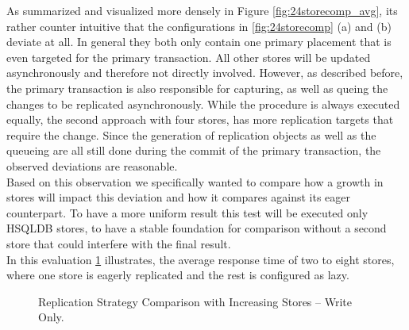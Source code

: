 As summarized and visualized more densely in Figure \ref{fig:24storecomp_avg},
its rather counter intuitive that the configurations in \ref{fig:24storecomp} (a) and (b) deviate at all. 
In general they both only contain one primary placement that is even targeted for the primary transaction.
All other stores will be updated asynchronously and therefore not directly involved.
However, as described before, the primary transaction is also responsible for capturing, as well as queing the changes to be replicated asynchronously.
While the procedure is always executed equally, the second approach with four stores, has more replication targets that require the change. 
Since the generation of replication objects as well as the queueing are all still done during the commit of the primary transaction, the observed
deviations are reasonable.\\


Based on this observation we specifically wanted to compare how a growth in stores will impact this deviation and how it compares against its eager counterpart. 
To have a more uniform result this test will be executed only HSQLDB stores, to have a stable foundation for comparison
without a second store that could interfere with the final result.\\
In this evaluation \ref{fig:stores_comp} illustrates, the average response time of two to eight stores, where one store is eagerly replicated and the rest
is configured as lazy.


\begin{figure}[t] 
    \centering 
    \centering
    \caption{Replication Strategy Comparison with Increasing Stores -- Write Only.}
    \label{fig:stores_comp}
\end{figure}

